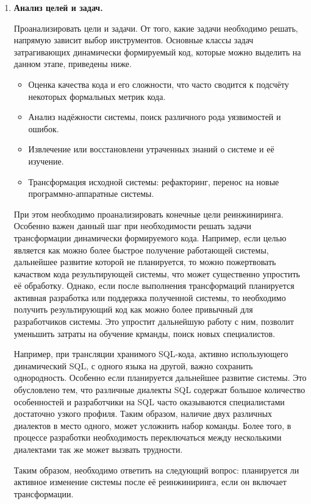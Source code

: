 \begin{enumerate}
  \item \textbf{Анализ целей и задач.}
  
  Проанализировать цели и задачи. От того, какие задачи необходимо решать, напрямую зависит выбор инструментов. Основные классы задач затрагивающих динамически формируемый код, которые можно выделить на данном этапе, приведены ниже.
  
  \begin{itemize}
    \item Оценка качества кода и его сложности, что часто сводится к подсчёту некоторых формальных метрик кода.
    \item Анализ надёжности системы, поиск различного рода уязвимостей и ошибок.
    \item Извлечение или восстановлени утраченных знаний о системе и её изучение.
    \item Трансформация исходной системы: рефакторинг, перенос на новые программно-аппаратные системы.
  \end{itemize}
  
  При этом необходимо проанализировать конечные цели реинжиниринга. Особенно важен данный шаг при необходимости решать задачи трансформации динамически формируемого кода. Например, если целью является как можно более быстрое получение работающей системы, дальнейшее развитие которой не планируется, то можно пожертвовать качаством кода результирующей системы, что может существенно упростить её обработку. Однако, если после выполнения трансформаций планируется активная разработка или поддержка полученной системы, то необходимо получить результирующий код как можно более привычный для разработчиков системы. Это упростит дальнейшую работу с ним, позволит уменьшить затраты на обучение крманды, поиск новых специалистов.
  
  Например, при трансляции хранимого SQL-кода, активно использующего динамический SQL, с одного языка на другой, важно сохранить однородность. Особенно если планируется дальнейшее развитие системы. Это обусловлено тем, что различные диалекты SQL содержат большое количество особенностей и разработчики на SQL часто оказываются специалистами достаточно узкого профиля. Таким образом, наличие двух различных диалектов в место одного, может усложнить набор команды. Более того, в процессе разработки необходимость переключаться между несколькими диалектами так же может вызвать трудности.
  
  Таким образом, необходимо ответить на следующий вопрос: планируется ли активное изменение системы после её реинжиниринга, если он включает трансформации.
  

\end{enumerate}
